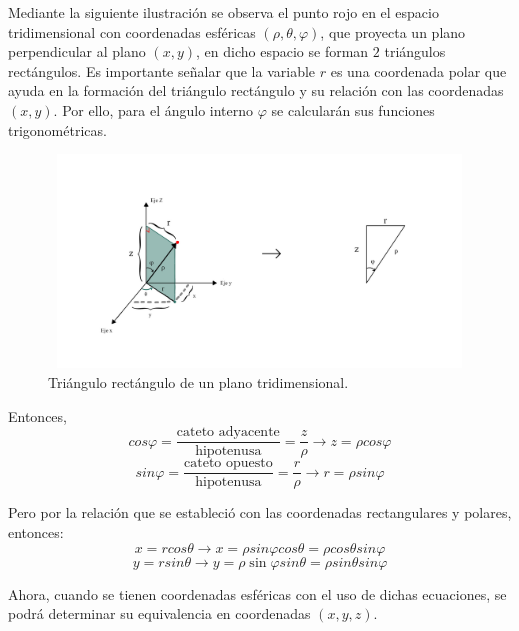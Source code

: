 Mediante la siguiente ilustración se observa el punto rojo en el espacio tridimensional con coordenadas esféricas $(\rho,\theta,\varphi)$, que proyecta un plano perpendicular al plano $(x,y)$, en dicho espacio se forman $2$ triángulos rectángulos. Es importante señalar que la variable $r$ es una coordenada polar que ayuda en la formación del triángulo rectángulo y su relación con las coordenadas $(x,y)$. Por ello, para el ángulo interno $\varphi$ se calcularán sus funciones trigonométricas.

\begin{figure}[H]
  \centering
  \includegraphics[width=11.17cm, height=5.67cm]{img/graph/coord_esf_2_rect_1.jpg}
  \caption{Triángulo rectángulo de un plano tridimensional.}
  \label{relacion_de_coordenadas}
\end{figure}

Entonces,
\[cos \varphi = \frac{\text{cateto adyacente}}{\text{hipotenusa}} = \frac{z}{\rho} \rightarrow z = \rho cos \varphi\]
\[sin \varphi = \frac{\text{cateto opuesto}}{\text{hipotenusa}} = \frac{r}{\rho} \rightarrow r = \rho sin \varphi\]

\vspace{4mm}
Pero por la relación que se estableció con las coordenadas rectangulares y polares, entonces:
\[x = r cos \theta \rightarrow x = \rho sin \varphi cos \theta = \rho cos \theta sin \varphi\]
\[y = r sin \theta \rightarrow y = \rho \sin \varphi sin \theta = \rho sin \theta sin \varphi\]

\vspace{4mm}
Ahora, cuando se tienen coordenadas esféricas con el uso de dichas ecuaciones, se podrá determinar su equivalencia en coordenadas $(x,y,z)$.
